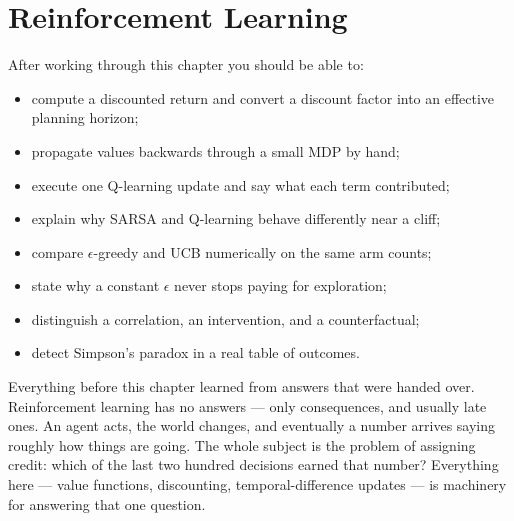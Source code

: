 
    \chapter{Reinforcement Learning}


\label{ch:reinforcement-learning}

\begin{learningobjectives}
After working through this chapter you should be able to:
\begin{itemize}
  \item compute a discounted return and convert a discount factor into an
        effective planning horizon;
  \item propagate values backwards through a small MDP by hand;
  \item execute one Q-learning update and say what each term contributed;
  \item explain why SARSA and Q-learning behave differently near a cliff;
  \item compare $\epsilon$-greedy and UCB numerically on the same arm counts;
  \item state why a constant $\epsilon$ never stops paying for exploration;
  \item distinguish a correlation, an intervention, and a counterfactual;
  \item detect Simpson's paradox in a real table of outcomes.
\end{itemize}
\end{learningobjectives}

\begin{plainlanguage}
Everything before this chapter learned from answers that were handed over.
Reinforcement learning has no answers --- only consequences, and usually late
ones. An agent acts, the world changes, and eventually a number arrives saying
roughly how things are going. The whole subject is the problem of assigning
credit: which of the last two hundred decisions earned that number? Everything
here --- value functions, discounting, temporal-difference updates --- is
machinery for answering that one question.
\end{plainlanguage}

